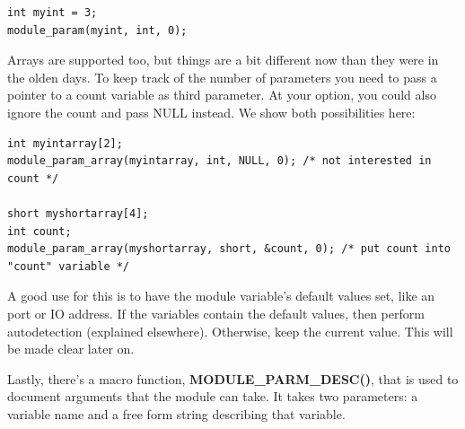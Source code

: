 \documentclass[11pt]{article}
\begin{document}
\begin{verbatim}
int myint = 3;
module_param(myint, int, 0);
\end{verbatim}

Arrays are supported too, but things are a bit different now than they were in the olden days. To keep track of the number of parameters you need to pass a pointer to a count variable as third parameter. At your option, you could also ignore the count and pass NULL instead. We show both possibilities here:

\begin{verbatim}
int myintarray[2];
module_param_array(myintarray, int, NULL, 0); /* not interested in count */

short myshortarray[4];
int count;
module_param_array(myshortarray, short, &count, 0); /* put count into "count" variable */
\end{verbatim}

A good use for this is to have the module variable's default values set, like an port or IO address. If the variables contain the default values, then perform autodetection (explained elsewhere). Otherwise, keep the current value. This will be made clear later on.

Lastly, there's a macro function, \textbf{MODULE\_PARM\_DESC()}, that is used to document arguments that the module can take. It takes two parameters: a variable name and a free form string describing that variable.
\end{document}
